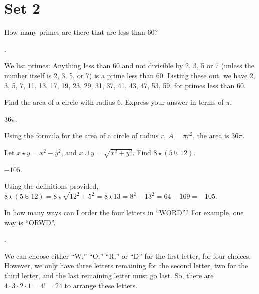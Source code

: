 \documentclass[11pt]{article}
\begin{document}
\eject

\section*{Set 2}

\begin{problem}How many primes are there that are less than 60?
\end{problem}

\begin{answer} . \end{answer}
\begin{solution}
We list primes: Anything less than 60 and not divisible by 2, 3, 5 or 7 (unless the number itself is 2, 3, 5, or 7) is a prime less than 60. Listing these out, we have 2, 3, 5, 7, 11, 13, 17, 19, 23, 29, 31, 37, 41, 43, 47, 53, 59, for  primes less than 60.
\end{solution}

\begin{problem}Find the area of a circle with radius 6. Express your answer in terms of $\pi$.
\end{problem}

\begin{answer} $\boxed{36\pi}$. \end{answer}
\begin{solution}
Using the formula for the area of a circle of radius $r$, $A = \pi r^2$, the area is $\boxed{36 \pi}$.
\end{solution}

\begin{problem} Let $x \star y = x^2 - y^2$, and $x \uplus y = \sqrt{x^2 + y^2}$. Find $8 \star (5 \uplus 12)$.
\end{problem}

\begin{answer} $\boxed{-105}$. \end{answer}
\begin{solution}
Using the definitions provided, $8 \star (5 \uplus 12) = 8 \star \sqrt{12^2 + 5^2} = 8 \star 13 = 8^2 - 13^2 = 64 - 169 = \boxed{-105}.$
\end{solution}

\begin{problem}In how many ways can I order the four letters in ``WORD''? For example, one way is ``ORWD''.
\end{problem}

\begin{answer} . \end{answer}
\begin{solution}
We can choose either ``W,'' ``O,'' ``R,'' or ``D'' for the first letter, for four choices. However, we only have three letters remaining for the second letter, two for the third letter, and the last remaining letter must go last. So, there are $4 \cdot 3 \cdot 2 \cdot 1 = 4! = \boxed{24}$ to arrange these letters.
\end{solution}
\end{document}
